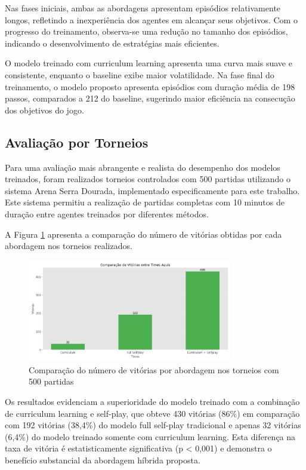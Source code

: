 Nas fases iniciais, ambas as abordagens apresentam episódios relativamente longos, refletindo a inexperiência dos agentes em alcançar seus objetivos. Com o progresso do treinamento, observa-se uma redução no tamanho dos episódios, indicando o desenvolvimento de estratégias mais eficientes.

O modelo treinado com curriculum learning apresenta uma curva mais suave e consistente, enquanto o baseline exibe maior volatilidade. Na fase final do treinamento, o modelo proposto apresenta episódios com duração média de 198 passos, comparados a 212 do baseline, sugerindo maior eficiência na consecução dos objetivos do jogo.

\subsection{Avaliação por Torneios}

Para uma avaliação mais abrangente e realista do desempenho dos modelos treinados, foram realizados torneios controlados com 500 partidas utilizando o sistema Arena Serra Dourada, implementado especificamente para este trabalho. Este sistema permitiu a realização de partidas completas com 10 minutos de duração entre agentes treinados por diferentes métodos.

A Figura \ref{fig:comparacao_vitorias} apresenta a comparação do número de vitórias obtidas por cada abordagem nos torneios realizados.

\begin{figure}[H]
    \centering
    \includegraphics[width=0.8\textwidth]{fig/graficos_trabalho/graficos_torneios/geral/comparacao_vitorias.png}
    \caption{Comparação do número de vitórias por abordagem nos torneios com 500 partidas}
    \label{fig:comparacao_vitorias}
\end{figure}

Os resultados evidenciam a superioridade do modelo treinado com a combinação de curriculum learning e self-play, que obteve 430 vitórias (86\%) em comparação com 192 vitórias (38,4\%) do modelo full self-play tradicional e apenas 32 vitórias (6,4\%) do modelo treinado somente com curriculum learning. Esta diferença na taxa de vitória é estatisticamente significativa (p < 0,001) e demonstra o benefício substancial da abordagem híbrida proposta.


